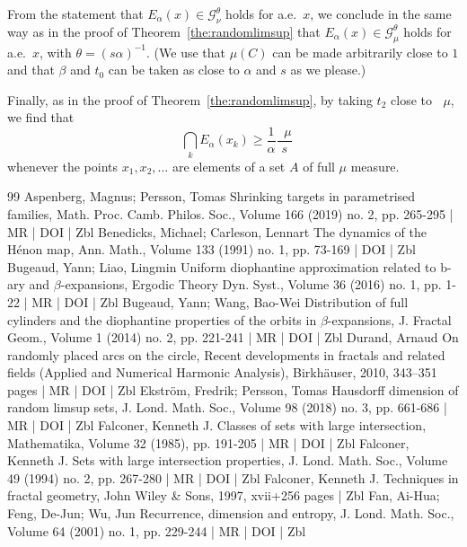 \documentclass[10pt]{amsart}
\theoremstyle{definition}\newtheorem{defi}[theo]{Definition}\newtheorem{rema}[theo]{Remark}\newtheorem{exam}[theo]{Example}\newtheorem{exem}[theo]{Example}\newtheorem{nota}[theo]{Notation}
\DeclareMathOperator{\dimh}{dim_H}
\DeclareMathOperator{\udimh}{\overline{dim}_H}
\begin{document}
From the statement that $E_\alpha (x) \in \mathscr{G}_\nu^\theta$ holds for a.e.\ $x$, we conclude in the same way as in the proof of Theorem~\ref{the:randomlimsup} that $E_\alpha (x) \in
\mathscr{G}_\mu^\theta$ holds for a.e.\ $x$, with $\theta = (s
\alpha)^{-1}$. (We use that $\mu(C)$ can be made arbitrarily close to
$1$ and that $\beta$ and $t_0$ can be taken as  close to $\alpha$ and $s$ as we please.)

Finally, as in the proof of Theorem~\ref{the:randomlimsup}, by taking $t_2$ close to $\udimh \mu$, we find that
\[
\dimh \bigcap_k E_\alpha (x_k) \geq \frac{1}{\alpha} \frac{\udimh
\mu}{s}
\]
whenever the points $x_1, x_2, \ldots$ are elements of a set $A$ of full $\mu$ measure.


\begin{thebibliography}{99}
Aspenberg, Magnus; Persson, Tomas Shrinking targets in parametrised families, Math. Proc. Camb. Philos. Soc., Volume 166 (2019) no. 2, pp. 265-295 | MR | DOI | Zbl
Benedicks, Michael; Carleson, Lennart The dynamics of the Hénon map, Ann. Math., Volume 133 (1991) no. 1, pp. 73-169 | DOI | Zbl
Bugeaud, Yann; Liao, Lingmin Uniform diophantine approximation related to b-ary and \ensuremath{\beta}-expansions, Ergodic Theory Dyn. Syst., Volume 36 (2016) no. 1, pp. 1-22 | MR | DOI | Zbl
Bugeaud, Yann; Wang, Bao-Wei Distribution of full cylinders and the diophantine properties of the orbits in \ensuremath{\beta}-expansions, J. Fractal Geom., Volume 1 (2014) no. 2, pp. 221-241 | MR | DOI | Zbl
Durand, Arnaud On randomly placed arcs on the circle, Recent developments in fractals and related fields (Applied and Numerical Harmonic Analysis), Birkhäuser, 2010, 343–351 pages | MR | DOI | Zbl
Ekström, Fredrik; Persson, Tomas Hausdorff dimension of random limsup sets, J. Lond. Math. Soc., Volume 98 (2018) no. 3, pp. 661-686 | MR | DOI | Zbl
Falconer, Kenneth J. Classes of sets with large intersection, Mathematika, Volume 32 (1985), pp. 191-205 | MR | DOI | Zbl
Falconer, Kenneth J. Sets with large intersection properties, J. Lond. Math. Soc., Volume 49 (1994) no. 2, pp. 267-280 | MR | DOI | Zbl
Falconer, Kenneth J. Techniques in fractal geometry, John Wiley \& Sons, 1997, xvii+256 pages | Zbl
Fan, Ai-Hua; Feng, De-Jun; Wu, Jun Recurrence, dimension and entropy, J. Lond. Math. Soc., Volume 64 (2001) no. 1, pp. 229-244 | MR | DOI | Zbl

\end{thebibliography}
\end{document}
